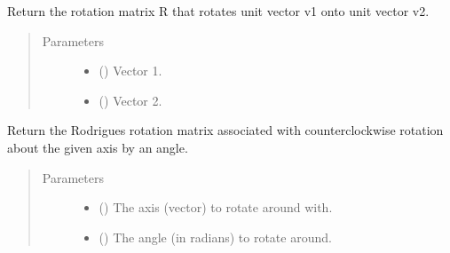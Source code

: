 \documentclass[letterpaper,10pt,english]{sphinxmanual}
\begin{document}

\begin{fulllineitems}
\label{\detokenize{utilities:acat.utilities.get_rotation_matrix}}
Return the rotation matrix R that rotates unit vector v1 onto
unit vector v2.
\begin{quote}\begin{description}
\item[{Parameters}] \leavevmode\begin{itemize}
\item {} 
 () \textendash{} Vector 1.

\item {} 
 () \textendash{} Vector 2.

\end{itemize}

\end{description}\end{quote}

\end{fulllineitems}


\begin{fulllineitems}
\label{\detokenize{utilities:acat.utilities.get_rodrigues_rotation_matrix}}
Return the Rodrigues rotation matrix associated with
counter\sphinxhyphen{}clockwise rotation about the given axis by an angle.
\begin{quote}\begin{description}
\item[{Parameters}] \leavevmode\begin{itemize}
\item {} 
 () \textendash{} The axis (vector) to rotate around with.

\item {} 
 () \textendash{} The angle (in radians) to rotate around.

\end{itemize}

\end{description}\end{quote}

\end{fulllineitems}
\end{document}
